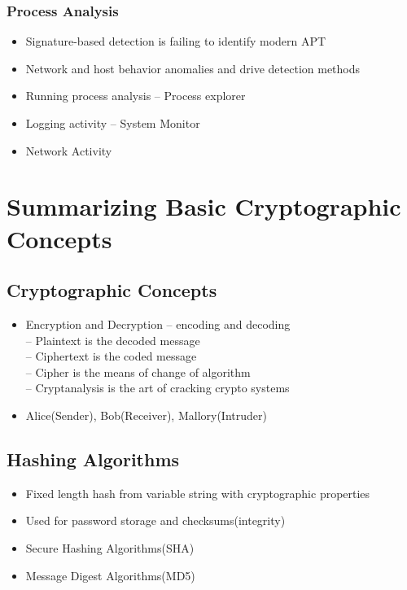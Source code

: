 		\subsubsection {Process Analysis}
			\begin{itemize}
				\item Signature-based detection is failing to identify modern APT
				\item Network and host behavior anomalies and drive detection methods
				\item Running process analysis -- Process explorer
				\item Logging activity -- System Monitor
				\item Network Activity
			\end{itemize}

\section {Summarizing Basic Cryptographic Concepts}
	\subsection {Cryptographic Concepts}
		\begin{itemize}
			\item Encryption and Decryption -- encoding and decoding \\
				-- Plaintext is the decoded message \\
				-- Ciphertext is the coded message \\
				-- Cipher is the means of change of algorithm \\
				-- Cryptanalysis is the art of cracking crypto systems
			\item Alice(Sender), Bob(Receiver), Mallory(Intruder)
		\end{itemize}
	\subsection {Hashing Algorithms}
		\begin{itemize}
			\item Fixed length hash from variable string with cryptographic properties
			\item Used for password storage and checksums(integrity)
			\item Secure Hashing Algorithms(SHA)
			\item Message Digest Algorithms(MD5)
		\end{itemize}
